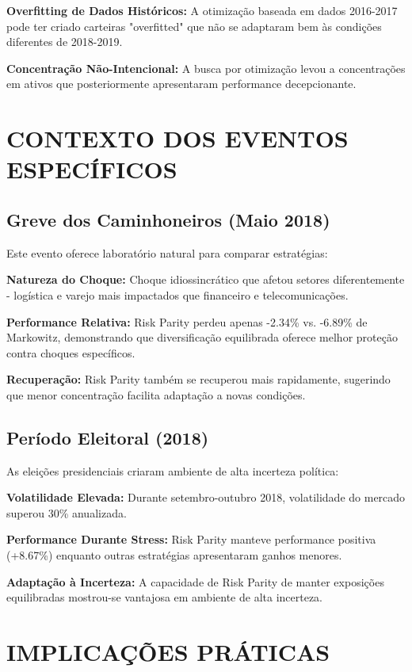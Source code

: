 \textbf{Overfitting de Dados Históricos:} A otimização baseada em dados 2016-2017 pode ter criado carteiras "overfitted" que não se adaptaram bem às condições diferentes de 2018-2019.

\textbf{Concentração Não-Intencional:} A busca por otimização levou a concentrações em ativos que posteriormente apresentaram performance decepcionante.

\section{CONTEXTO DOS EVENTOS ESPECÍFICOS}

\subsection{Greve dos Caminhoneiros (Maio 2018)}

Este evento oferece laboratório natural para comparar estratégias:

\textbf{Natureza do Choque:} Choque idiossincrático que afetou setores diferentemente - logística e varejo mais impactados que financeiro e telecomunicações.

\textbf{Performance Relativa:} Risk Parity perdeu apenas -2.34\% vs. -6.89\% de Markowitz, demonstrando que diversificação equilibrada oferece melhor proteção contra choques específicos.

\textbf{Recuperação:} Risk Parity também se recuperou mais rapidamente, sugerindo que menor concentração facilita adaptação a novas condições.

\subsection{Período Eleitoral (2018)}

As eleições presidenciais criaram ambiente de alta incerteza política:

\textbf{Volatilidade Elevada:} Durante setembro-outubro 2018, volatilidade do mercado superou 30\% anualizada.

\textbf{Performance Durante Stress:} Risk Parity manteve performance positiva (+8.67\%) enquanto outras estratégias apresentaram ganhos menores.

\textbf{Adaptação à Incerteza:} A capacidade de Risk Parity de manter exposições equilibradas mostrou-se vantajosa em ambiente de alta incerteza.

\section{IMPLICAÇÕES PRÁTICAS}

